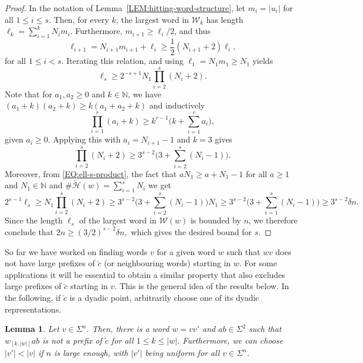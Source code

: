 \documentclass[11pt,reqno]{amsart}
\theoremstyle{plain}
\newtheorem{lemma}[theorem]{Lemma}
\theoremstyle{definition}
\newcommand{\N}{{\mathbb N}}
\newcommand{\mc}{\mathcal}
\begin{document}
\begin{proof}
In the notation of Lemma~\ref{LEM:hitting-word-structure}, let $m_i = |u_i|$ for all $1\leqslant i \leqslant s$. Then, for every $k$, the largest word in $\mc W_k$ has length $\ell_k = \sum_{i=1}^k N_i m_i$. Furthermore, $m_{i+1} \geqslant \ell_i/2$, and thus
\[
\ell_{i+1} = N_{i+1} m_{i+1} + \ell_i
\geqslant \frac{1}{2} (N_{i+1} + 2) \ell_i,
\]
for all $1\leqslant i < s$. Iterating this relation, and using $\ell_1 = N_1 m_1 \geqslant N_1$ yields
\begin{equation}
\label{EQ:ell-s-product}
\ell_s \geqslant 2^{-s+1} N_1 \prod_{i=2}^s (N_i + 2).
\end{equation}
Note that for $a_1,a_2\geqslant 0$ and $k \in \N$, we have
$
(a_1 + k)(a_2 + k) \geqslant k(a_1 + a_2 + k)
$
and inductively
\[
\prod_{i=1}^r (a_i + k) \geqslant k^{r-1} \biggl( k+\sum_{i=1}^r a_i  \biggr),
\]
given $a_i \geqslant 0$.
Applying this with $a_i = N_{i+1} -1$ and $k=3$ gives
\[
\prod_{i=2}^s (N_i + 2) \geqslant 3^{s-2} \biggl( 3 + \sum_{i=2}^s (N_i - 1) \biggr).
\]
Moreover, 
from \eqref{EQ:ell-s-product}, the fact that $a N_1\geq a+N_1-1$ for all $a\geq 1$ and $N_1\in\mathbb{N}$ and $\# \widetilde{\mc H}(w) = \sum_{i=1}^s N_i$ we get
\[
2^{s-1} \ell_s \geqslant N_1 \prod_{i=2}^s (N_i + 2) \geqslant 3^{s-2}\biggl( 3 + \sum_{i=2}^s (N_i - 1) \biggr)N_1 \geqslant 3^{s-2}\biggl( 3 + \sum_{i=1}^s (N_i - 1) \biggr) \geqslant 3^{s-2} \delta n.
\]
Since the length $\ell_s$ of the largest word in $\mc W(w)$ is bounded by $n$, we therefore conclude that 
$
2n \geqslant (3/2)^{s-2} \delta n,
$
which gives the desired bound for $s$.
\end{proof}


So far we have worked on finding words $v$ for a given word $w$ such that $wv$ does not have large prefixes of $\breve{c}$ (or neighbouring words) starting in $w$. For some applications it will be essential to obtain a similar property that also excludes large prefixes of $\breve{c}$ starting in $v$. This is the general idea of the results below.
In the following, if $\breve{c}$ is a dyadic point, arbitrarily choose one of its dyadic representations.

\begin{lemma}
\label{LEM:sliding-out-block-I}
Let $v \in \Sigma^n$. Then, there is a word $w = v v'$ and $ab \in \Sigma^2$ such that $w_{[k,|w|]}ab$ is not a prefix of $\breve{c}$ for all $1\leqslant k \leqslant |w|$.
Furthermore, we can choose $|v'| < |v|$ if $n$ is large enough, with $|v'|$ being uniform for all $v \in \Sigma^n$.
\end{lemma}
\end{document}
